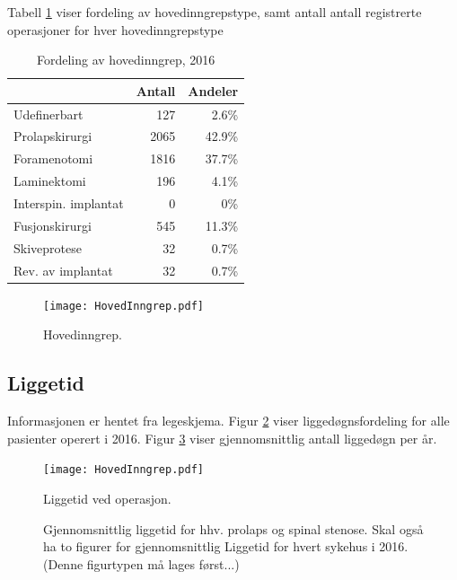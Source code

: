 \documentclass [norsk,a4paper,twoside]{article}\usepackage[]{graphicx}\usepackage[]{color}
\begin{document}
Tabell \ref{tab:AntHovedInngrep} viser fordeling av hovedinngrepstype, samt antall antall registrerte operasjoner for hver hovedinngrepstype

\begin{table}[ht]
\centering
\begin{tabular}{lrr}
  \hline
 & Antall & Andeler \\ 
  \hline
Udefinerbart & 127 & 2.6\% \\ 
  Prolapskirurgi & 2065 & 42.9\% \\ 
  Foramenotomi & 1816 & 37.7\% \\ 
  Laminektomi & 196 & 4.1\% \\ 
  Interspin. implantat & 0 & 0\% \\ 
  Fusjonskirurgi & 545 & 11.3\% \\ 
  Skiveprotese & 32 & 0.7\% \\ 
  Rev. av implantat & 32 & 0.7\% \\ 
   \hline
\end{tabular}
\caption{Fordeling av hovedinngrep, 2016} 
\label{tab:AntHovedInngrep}
\end{table}



\begin{figure}[ht]
\centering \texttt{[image: HovedInngrep.pdf]}
\caption{\label{fig:HovedInngrep} Hovedinngrep.}
\end{figure}




\subsection{Liggetid}

Informasjonen er hentet fra legeskjema.
Figur \ref{fig:Liggedogn} viser liggedøgnsfordeling for alle pasienter operert i 2016. Figur \ref{fig:LiggedognTid} viser gjennomsnittlig antall liggedøgn per år.  




\begin{figure}[h] 
\centering \texttt{[image: HovedInngrep.pdf]}
\caption{Liggetid ved operasjon.}
\label{fig:Liggedogn}
\end{figure}

\begin{figure}[h] 
\centerline{
}
\caption{Gjennomsnittlig liggetid for hhv. prolaps og spinal stenose. Skal også ha to figurer for gjennomsnittlig Liggetid for hvert sykehus i 2016. (Denne figurtypen må lages først...)}
\label{fig:LiggedognTid}
\end{figure}
\end{document}
